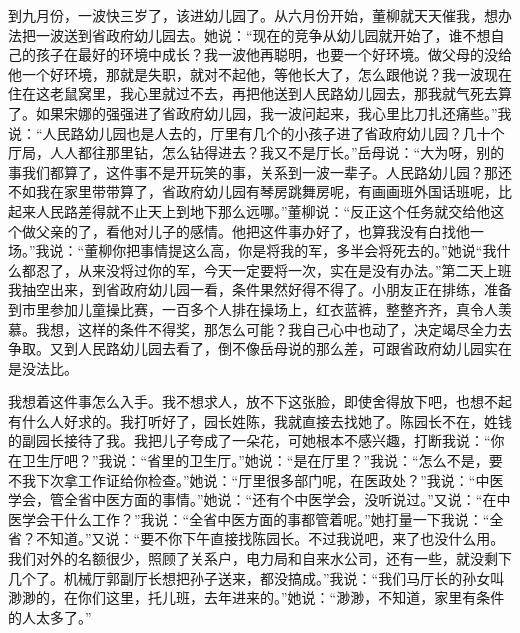 \documentclass[12pt,oneside]{book}
\begin{document}
到九月份，一波快三岁了，该进幼儿园了。从六月份开始，董柳就天天催我，想办法把一波送到省政府幼儿园去。她说：``现在的竞争从幼儿园就开始了，谁不想自己的孩子在最好的环境中成长？我一波他再聪明，也要一个好环境。做父母的没给他一个好环境，那就是失职，就对不起他，等他长大了，怎么跟他说？我一波现在住在这老鼠窝里，我心里就过不去，再把他送到人民路幼儿园去，那我就气死去算了。如果宋娜的强强进了省政府幼儿园，我一波问起来，我心里比刀扎还痛些。''我说：``人民路幼儿园也是人去的，厅里有几个的小孩子进了省政府幼儿园？几十个厅局，人人都往那里钻，怎么钻得进去？我又不是厅长。''岳母说：``大为呀，别的事我们都算了，这件事不是开玩笑的事，关系到一波一辈子。人民路幼儿园？那还不如我在家里带带算了，省政府幼儿园有琴房跳舞房呢，有画画班外国话班呢，比起来人民路差得就不止天上到地下那么远哪。''董柳说：``反正这个任务就交给他这个做父亲的了，看他对儿子的感情。他把这件事办好了，也算我没有白找他一场。''我说：``董柳你把事情提这么高，你是将我的军，多半会将死去的。''她说``我什么都忍了，从来没将过你的军，今天一定要将一次，实在是没有办法。''第二天上班我抽空出来，到省政府幼儿园一看，条件果然好得不得了。小朋友正在排练，准备到市里参加儿童操比赛，一百多个人排在操场上，红衣蓝裤，整整齐齐，真令人羡慕。我想，这样的条件不得奖，那怎么可能？我自己心中也动了，决定竭尽全力去争取。又到人民路幼儿园去看了，倒不像岳母说的那么差，可跟省政府幼儿园实在是没法比。

我想着这件事怎么入手。我不想求人，放不下这张脸，即使舍得放下吧，也想不起有什么人好求的。我打听好了，园长姓陈，我就直接去找她了。陈园长不在，姓钱的副园长接待了我。我把儿子夸成了一朵花，可她根本不感兴趣，打断我说：``你在卫生厅吧？''我说：``省里的卫生厅。''她说：``是在厅里？''我说：``怎么不是，要不我下次拿工作证给你检查。''她说：``厅里很多部门呢，在医政处？''我说：``中医学会，管全省中医方面的事情。''她说：``还有个中医学会，没听说过。''又说：``在中医学会干什么工作？''我说：``全省中医方面的事都管着呢。''她打量一下我说：``全省？不知道。''又说：``要不你下午直接找陈园长。不过我说吧，来了也没什么用。我们对外的名额很少，照顾了关系户，电力局和自来水公司，还有一些，就没剩下几个了。机械厅郭副厅长想把孙子送来，都没搞成。''我说：``我们马厅长的孙女叫渺渺的，在你们这里，托儿班，去年进来的。''她说：``渺渺，不知道，家里有条件的人太多了。''
\end{document}
